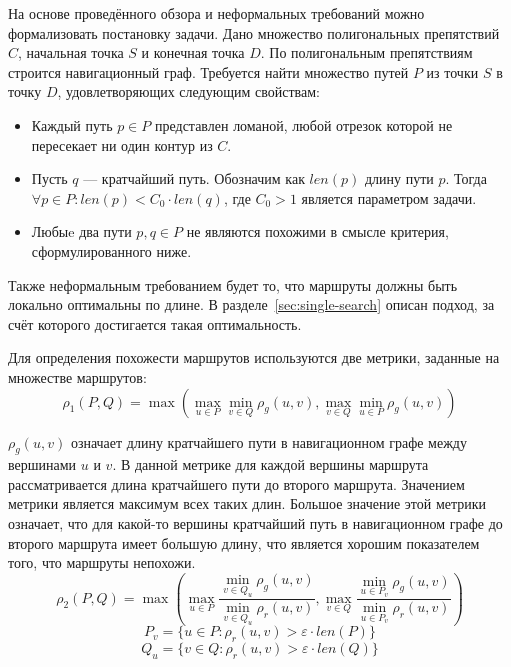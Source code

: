 \label{sec:formal-task}

На основе проведённого обзора и неформальных требований можно
формализовать постановку задачи. Дано множество полигональных
препятствий $C$, начальная точка $S$ и конечная точка $D$. По
полигональным препятствиям строится навигационный граф. Требуется
найти множество путей $P$ из точки $S$ в точку $D$, удовлетворяющих
следующим свойствам:
\begin{itemize}
  \item Каждый путь $p \in P$ представлен ломаной, любой отрезок
    которой не пересекает ни один контур из $C$.
  \item Пусть $q$ --- кратчайший путь. Обозначим как $len(p)$ длину
    пути $p$. Тогда $\forall p \in P: len(p) < C_0 \cdot len(q)$, где
    $C_0 > 1$ является параметром задачи.
  \item Любыe два пути $p, q \in P$ не являются похожими в смысле
    критерия, сформулированного ниже.
\end{itemize}
Также неформальным требованием будет то, что маршруты должны быть
локально оптимальны по длине. В разделе~\ref{sec:single-search} описан
подход, за счёт которого достигается такая оптимальность.

Для определения похожести маршрутов используются две метрики,
заданные на множестве маршрутов:
\begin{equation*}
    \rho_1 (P, Q) = \max(\max_{u \in P} \min_{v \in Q} \rho_g(u,
    v), \max_{v \in Q} \min_{u \in P} \rho_g(u, v))
\end{equation*}

$\rho_g(u, v)$ означает длину кратчайшего пути в навигационном графе
между вершинами $u$ и $v$. В данной метрике для каждой вершины
маршрута рассматривается длина кратчайшего пути до второго маршрута.
Значением метрики является максимум всех таких длин. Большое значение
этой метрики означает, что для какой-то вершины кратчайший путь в
навигационном графе до второго маршрута имеет большую длину, что
является хорошим показателем того, что маршруты непохожи.
\begin{equation*}
    \rho_2 (P, Q) = \max(\max_{u \in P} \frac{\min\limits_{v \in Q_u}
    \rho_g(u, v)}{\min\limits_{v \in Q_u} \rho_r(u, v)}, \max\limits_{v \in Q} \frac{\min\limits_{u \in P_v}
    \rho_g(u, v)}{\min\limits_{u \in P_v} \rho_r(u, v)})
\end{equation*}
\begin{equation*}
    P_v = \{ u \in P : \rho_r(u, v) > \varepsilon \cdot len(P) \}
\end{equation*}
\begin{equation*}
    Q_u = \{ v \in Q : \rho_r(u, v) > \varepsilon \cdot len(Q) \}
\end{equation*}

